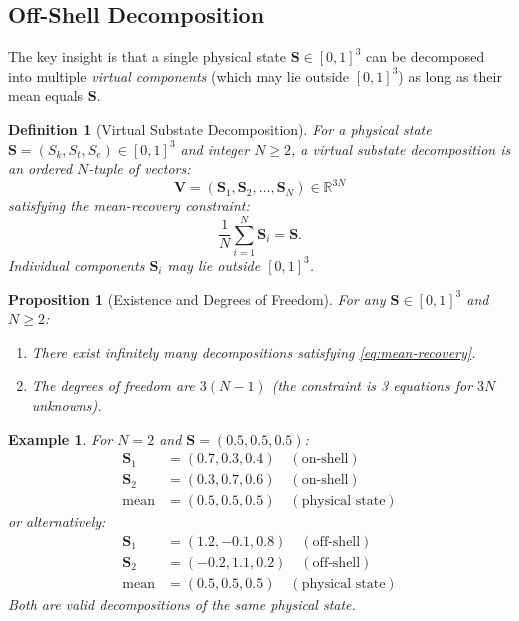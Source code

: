 \documentclass[twocolumn,11pt,a4paper]{article}
\newtheorem{proposition}[theorem]{Proposition}
\newtheorem{definition}[theorem]{Definition}
\newtheorem{example}[theorem]{Example}
\newcommand{\Sk}{S_k}
\newcommand{\St}{S_t}
\newcommand{\Se}{S_e}
\newcommand{\Stuple}{\mathbf{S}}
\begin{document}
\subsection{Off-Shell Decomposition}

The key insight is that a single physical state $\Stuple \in [0,1]^3$ can be decomposed into multiple \emph{virtual components} (which may lie outside $[0,1]^3$) as long as their mean equals $\Stuple$.

\begin{definition}[Virtual Substate Decomposition]
For a physical state $\Stuple = (\Sk, \St, \Se) \in [0,1]^3$ and integer $N \geq 2$, a \emph{virtual substate decomposition} is an ordered $N$-tuple of vectors:
\begin{equation}
  \mathbf{V} = (\Stuple_1, \Stuple_2, \ldots, \Stuple_N) \in \mathbb{R}^{3N}
\end{equation}
satisfying the \emph{mean-recovery constraint}:
\begin{equation}
  \frac{1}{N}\sum_{i=1}^{N} \Stuple_i = \Stuple.
  \label{eq:mean-recovery}
\end{equation}
Individual components $\Stuple_i$ may lie outside $[0,1]^3$.
\end{definition}

\begin{proposition}[Existence and Degrees of Freedom]
For any $\Stuple \in [0,1]^3$ and $N \geq 2$:
\begin{enumerate}[nosep,label=(\roman*)]
  \item There exist infinitely many decompositions satisfying \eqref{eq:mean-recovery}.
  \item The degrees of freedom are $3(N-1)$ (the constraint is 3 equations for $3N$ unknowns).
\end{enumerate}
\end{proposition}

\begin{example}
For $N=2$ and $\Stuple = (0.5, 0.5, 0.5)$:
\begin{align}
\Stuple_1 &= (0.7, 0.3, 0.4) \quad (\text{on-shell})\\
\Stuple_2 &= (0.3, 0.7, 0.6) \quad (\text{on-shell})\\
\text{mean} &= (0.5, 0.5, 0.5) \quad (\text{physical state})
\end{align}
or alternatively:
\begin{align}
\Stuple_1 &= (1.2, -0.1, 0.8) \quad (\text{off-shell})\\
\Stuple_2 &= (-0.2, 1.1, 0.2) \quad (\text{off-shell})\\
\text{mean} &= (0.5, 0.5, 0.5) \quad (\text{physical state})
\end{align}
Both are valid decompositions of the same physical state.
\end{example}
\end{document}
